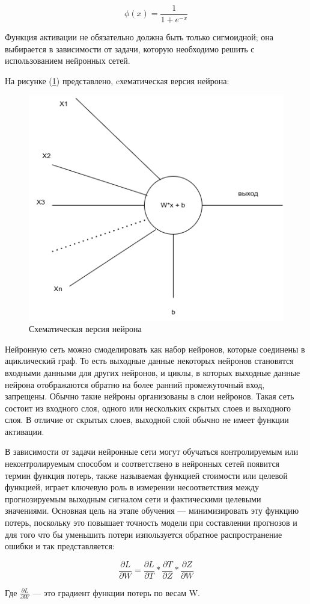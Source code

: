 \[
    \phi(x) = \frac{1}{1 + e^{-x}}
\]

Функция активации не обязательно должна быть только сигмоидной; она выбирается в зависимости от задачи, которую необходимо решить с использованием нейронных сетей.

На рисунке (\ref{fig:neuron}) представлено, cхематическая версия нейрона: 
\begin{figure}[H]
	\centering
	\includegraphics[width=0.5\linewidth]{images/neuron.png}
	\caption{Схематическая версия нейрона}
	\label{fig:neuron}
\end{figure}

Нейронную сеть можно смоделировать как набор нейронов, которые соединены в ациклический граф. То есть выходные данные некоторых нейронов становятся входными данными для других нейронов, и циклы, в которых выходные данные нейрона отображаются обратно на более ранний промежуточный вход, запрещены. Обычно такие нейроны организованы в слои нейронов. Такая сеть состоит из входного слоя, одного или нескольких скрытых слоев и выходного слоя. В отличие от скрытых слоев, выходной слой обычно не имеет функции активации.

В зависимости от задачи нейронные сети могут обучаться контролируемым или неконтролируемым способом и соответствено в нейронных сетей появится термин функция потерь, также называемая функцией стоимости или целевой функцией, играет ключевую роль в измерении несоответствия между прогнозируемым выходным сигналом сети и фактическими целевыми значениями. Основная цель на этапе обучения — минимизировать эту функцию потерь, поскольку это повышает точность модели при составлении прогнозов и для того что бы уменьшить потери изпользуется обратное распространение ошибки и так представляется:

\[
    \frac{\partial L}{\partial W} = \frac{\partial L}{\partial T} * \frac{\partial T}{\partial Z} * \frac{\partial Z}{\partial W}
\]

Где \(\frac{\partial L}{\partial W}\) — это градиент функции потерь по весам W.

